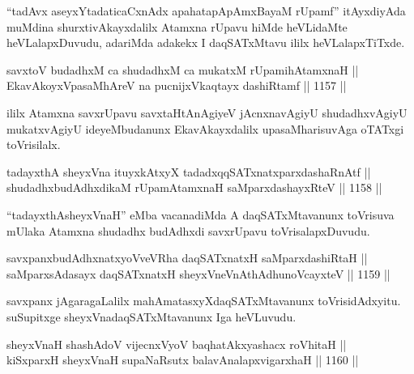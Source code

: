 \begin{artha}
``tadAvx aseyxYtadaticaCxnAdx apahatapApAmxBayaM rUpamf'' itAyxdiyAda muMdina shurxtivAkayxdalilx Atamxna rUpavu hiMde heVLidaMte heVLalapxDuvudu, adariMda adakekx I daqSATxMtavu ililx heVLalapxTiTxde.
\end{artha}

\begin{shl}
savxtoV budadhxM ca shudadhxM ca mukatxM rUpamihA\s \s tamxnaH || \\
EkavAkoyxVpasaMhAreV na pucnijxVkaqtayx dashiRtamf \hfill || 1157 ||  
\end{shl}

\begin{artha}
ililx Atamxna savxrUpavu savxtaHtAnAgiyeV jAcnxnavAgiyU shudadhxvAgiyU mukatxvAgiyU ideyeMbudanunx EkavAkayxdalilx upasaMharisuvAga oTATxgi toVrisilalx.
\end{artha}


\begin{shl}
tadayxthA sheyxVna ituyxkAtxyX tadadxqqSATxnatxparxdashaRnAtf || \\
shudadhxbudAdhxdikaM rUpamAtamxnaH saMparxdashayxRteV \hfill || 1158 ||  
\end{shl}

\begin{artha}
``tadayxthAsheyxVnaH'' eMba vacanadiMda A daqSATxMtavanunx toVrisuva mUlaka Atamxna shudadhx budAdhxdi savxrUpavu toVrisalapxDuvudu.
\end{artha}


\begin{shl}
savxpanxbudAdhxnatxyoVveVRha daqSATxnatxH saMparxdashiRtaH || \\
saMparxsAdasayx daqSATxnatxH sheyxVneVnAthAdhunoVcayxteV \hfill || 1159 ||  
\end{shl}

\begin{artha}
savxpanx jAgaragaLalilx mahAmatasxyXdaqSATxMtavanunx toVrisidAdxyitu. suSupitxge sheyxVnadaqSATxMtavanunx Iga heVLuvudu.
\end{artha}


\begin{shl}
sheyxVnaH shashAdoV vijecnxVyoV baqhatAkxyashacx roVhitaH || \\
kiSxparxH sheyxVnaH supaNaRsutx balavAnalapxvigarxhaH \hfill || 1160 ||  
\end{shl}

